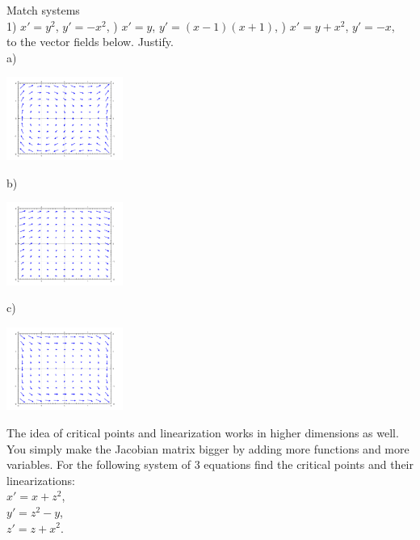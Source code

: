 \begin{exercise}
Match systems\\
1) $x'=y^2$, $y'=-x^2$,
) $x'=y$, $y'=(x-1)(x+1)$,
) $x'=y+x^2$, $y'=-x$,
\\
to the vector fields below.  Justify.
\\
a)
\parbox[c]{1.6in}{\includegraphics[width=1.5in]{figures/nlin-exer-y-xm1xp1}}
b)
\parbox[c]{1.6in}{\includegraphics[width=1.5in]{figures/nlin-exer-ypx2-mx}}
c)
\parbox[c]{1.6in}{\includegraphics[width=1.5in]{figures/nlin-exer-y2-mx2}}
\end{exercise}


\begin{exercise}
The idea of critical points and linearization works in higher dimensions as
well.  You simply make the Jacobian matrix bigger by adding more functions
and more variables.  For the following system
of 3 equations find the critical points and their linearizations:\\
$x' = x + z^2$,\\$y' = z^2-y$,\\$z' = z+x^2$.
\end{exercise}


